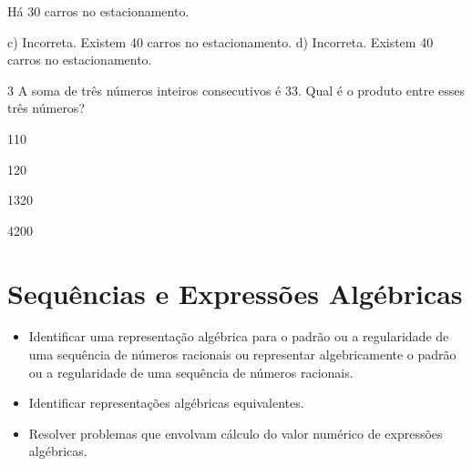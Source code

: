 \begin{escolha}
{{{\begin{escolha}
{Há 30 carros no estacionamento.

c) Incorreta. Existem 40 carros no estacionamento. 
d) Incorreta. Existem 40 carros no estacionamento. 
}

\num{3} A soma de três números inteiros consecutivos é 33. Qual é o produto
entre esses três números?

\begin{escolha}
  \item 110

  \item 120

  \item 1320

  \item 4200
\end{escolha}


\pagestyle{mat}
\chapter{Sequências e Expressões Algébricas}


\begin{itemize}

  \item Identificar uma representação algébrica para o padrão ou a
regularidade de uma sequência de números racionais ou representar
algebricamente o padrão ou a regularidade de uma sequência de
números racionais. 
  \item Identificar representações algébricas equivalentes. 
  \item Resolver problemas que envolvam cálculo do valor numérico de
expressões algébricas. 

\end{itemize} 

\end{escolha}}}}
\end{escolha}
